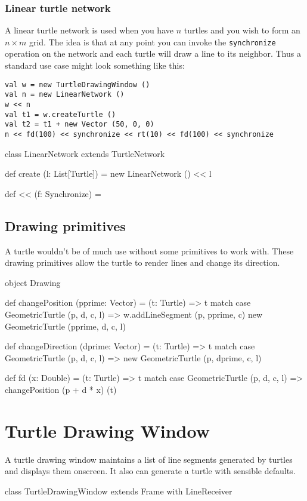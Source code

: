\documentclass{article}
\begin{document}
      \subsubsection{Linear turtle network}
        \label{sec:linear-turtle-network}

        A linear turtle network is used when you have $n$ turtles and you wish to form an $n\times m$ grid. The idea is that at any point you can invoke the
        {\tt synchronize} operation on the network and each turtle will draw a line to its neighbor. Thus a standard use case might look something like this:

        \begin{verbatim}
val w = new TurtleDrawingWindow ()
val n = new LinearNetwork ()
w << n
val t1 = w.createTurtle ()
val t2 = t1 + new Vector (50, 0, 0)
n << fd(100) << synchronize << rt(10) << fd(100) << synchronize
        \end{verbatim}

        \begin{scalacode}
class LinearNetwork extends TurtleNetwork {
  def create (l: List[Turtle]) = new LinearNetwork () << l
  
  def << (f: Synchronize) = 
}
        \end{scalacode}

    \subsection{Drawing primitives}
      \label{sec:drawing-primitives}

      A turtle wouldn't be of much use without some primitives to work with. These drawing primitives allow the turtle to render lines and change its direction.

      \begin{scalacode}
object Drawing {
  def changePosition (pprime: Vector) = (t: Turtle) => t match {
    case GeometricTurtle (p, d, c, l) => {w.addLineSegment (p, pprime, c)
                                          new GeometricTurtle (pprime, d, c, l)}}

  def changeDirection (dprime: Vector) = (t: Turtle) => t match {
    case GeometricTurtle (p, d, c, l) => new GeometricTurtle (p, dprime, c, l)}

  def fd (x: Double) = (t: Turtle) => t match {
    case GeometricTurtle (p, d, c, l) => changePosition (p + d * x) (t)}
}
      \end{scalacode}

  \section{Turtle Drawing Window}
    \label{sec:turtle-drawing-window}

    A turtle drawing window maintains a list of line segments generated by turtles and displays them onscreen. It also can generate a turtle with sensible
    defaults.

    \begin{scalacode}
class TurtleDrawingWindow extends Frame with LineReceiver {
}
    \end{scalacode}

\end{document}
